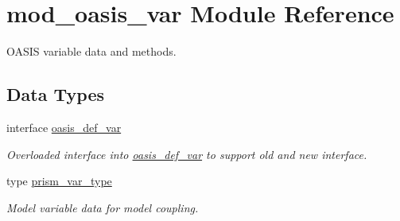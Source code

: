 \hypertarget{namespacemod__oasis__var}{}\section{mod\+\_\+oasis\+\_\+var Module Reference}
\label{namespacemod__oasis__var}


O\+A\+S\+IS variable data and methods.  


\subsection*{Data Types}
\begin{DoxyCompactItemize}
\item 
interface \hyperlink{interfacemod__oasis__var_1_1oasis__def__var}{oasis\+\_\+def\+\_\+var}
\begin{DoxyCompactList}\small\item\em Overloaded interface into \hyperlink{interfacemod__oasis__var_1_1oasis__def__var}{oasis\+\_\+def\+\_\+var} to support old and new interface. \end{DoxyCompactList}\item 
type \hyperlink{structmod__oasis__var_1_1prism__var__type}{prism\+\_\+var\+\_\+type}
\begin{DoxyCompactList}\small\item\em Model variable data for model coupling. \end{DoxyCompactList}\end{DoxyCompactItemize}
